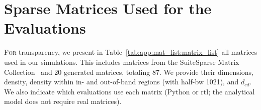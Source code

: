 
\section{Sparse Matrices Used for the Evaluations}
\label{app:mat_list}

\lettrine{F}{or} transparency, we present in Table~\ref{tab:app:mat_list:matrix_list} all matrices used in our simulations.
This includes matrices from the SuiteSparse Matrix Collection~\cite{Kolodziej2019_SuiteSparse} and 20 generated matrices, totaling 87.
We provide their dimensions, density, density within in- and out-of-\gls{band} regions (with half-\gls{bw} 1021), and $d_\mathit{cd}$.
We also indicate which evaluations use each matrix (Python or \acrshort{rtl}; the analytical model does not require real matrices).

